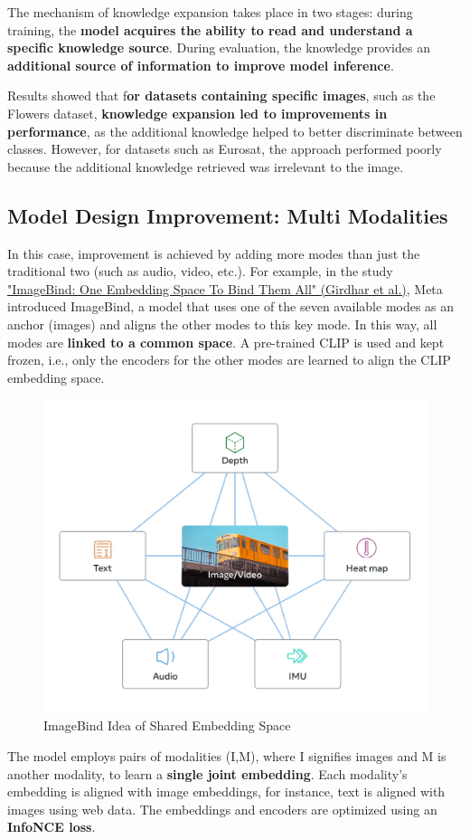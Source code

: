 The mechanism of knowledge expansion takes place in two stages: during training, the \textbf{model acquires the ability to read and understand a specific knowledge source}. During evaluation, the knowledge provides an \textbf{additional source of information to improve model inference}.

Results showed that f\textbf{or datasets containing specific images}, such as the Flowers dataset, \textbf{knowledge expansion led to improvements in performance}, as the additional knowledge helped to better discriminate between classes. However, for datasets such as Eurosat, the approach performed poorly because the additional knowledge retrieved was irrelevant to the image. 


\subsection{Model Design Improvement: Multi Modalities}

In this case, improvement is achieved by adding more modes than just the traditional two (such as audio, video, etc.). For example, in the study \href{https://arxiv.org/pdf/2305.05665}{"ImageBind: One Embedding Space To Bind Them All" (Girdhar et al.)}, Meta introduced ImageBind, a model that uses one of the seven available modes as an anchor (images) and aligns the other modes to this key mode. In this way, all modes are \textbf{linked to a common space}. A pre-trained CLIP is used and kept frozen, i.e., only the encoders for the other modes are learned to align the CLIP embedding space.

\begin{figure}[!htbp]
    \centering
    \includegraphics[width=0.6\linewidth]{tikz/chapter11 - ImageBind.png}
    \caption{ImageBind Idea of Shared Embedding Space}
\end{figure}

The model employs pairs of modalities (I,M), where I signifies images and M is another modality, to learn a \textbf{single joint embedding}. Each modality’s embedding is aligned with image embeddings, for instance, text is aligned with images using web data. The embeddings and encoders are optimized using an \textbf{InfoNCE loss}.

